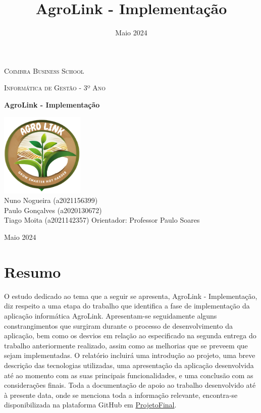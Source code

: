 \documentclass[a4paper,12pt]{report}
\title{AgroLink - Implementação}
\author{}
\date{Maio 2024}
\begin{document}
	
	\begin{titlepage}
		\centering
		{\scshape\LARGE Coimbra Business School \par}
		\vspace{1cm}
		{\scshape\Large Informática de Gestão - 3º Ano \par}
		\vspace{1.5cm}
		{\huge\bfseries AgroLink - Implementação \par}
		\vspace{2cm}
		\includegraphics[width=0.3\textwidth]{AGROLINK.png} %
		\vspace{3cm}
		\large
		\\Nuno Nogueira (a2021156399)\\
		Paulo Gonçalves (a2020130672)\\
		Tiago Moita (a2021142357)
		\vfill
		Orientador: Professor Paulo Soares \par
		\vfill
		{\large Maio 2024 \par}
	\end{titlepage}
	
	\newpage
	\chapter*{Resumo}
	 O estudo dedicado ao tema que a seguir se apresenta, AgroLink - Implementação, diz respeito a uma etapa do trabalho que identifica a fase de implementação da aplicação informática AgroLink. Apresentam-se seguidamente alguns constrangimentos que surgiram durante o processo de desenvolvimento da aplicação, bem como os desvios em relação ao especificado na segunda entrega do trabalho anteriormente realizado, assim como as melhorias que se preveem que sejam implementadas. O relatório 	 incluirá uma introdução ao projeto, uma breve descrição das tecnologias utilizadas, uma apresentação da aplicação desenvolvida até ao momento com as suas principais funcionalidades, e uma conclusão com as considerações finais. Toda a documentação de apoio ao trabalho desenvolvido até à presente data, onde se menciona toda a informação relevante, encontra-se disponibilizada na plataforma GitHub  em  \href{https://github.com/nunonogueira03/ProjetoFinal}{ProjetoFinal}.
	 
\end{document}
